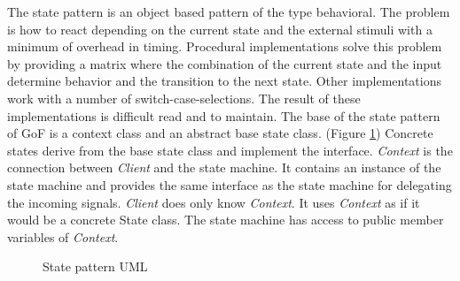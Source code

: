 {\noindent The state pattern is an object based pattern of the type behavioral. The problem is how to react depending on the current state and the external stimuli with a minimum of overhead in timing. Procedural implementations solve this problem by providing a matrix where the combination of the current state and the input determine behavior and the transition to the next state. Other implementations work with a number of switch-case-selections. The result of these implementations is difficult read and to maintain. The base of the state pattern of GoF is a context class and an abstract base state class. (Figure \ref{fig:statePattern}) Concrete states derive from the base state class and implement the interface. \emph{Context} is the connection between \emph{Client} and the state machine. It contains an instance of the state machine and provides the same interface as the state machine for delegating the incoming signals. \emph{Client} does only know \emph{Context}. It uses \emph{Context} as if it would be a concrete State class. The state machine has access to public member variables of \emph{Context}. \cite[cf.][372 - 377]{GoF2015} 

\begin{figure}[]{}
\centering
\mbox{}
\caption{State pattern UML}
\label{fig:statePattern}
\end{figure}

}
